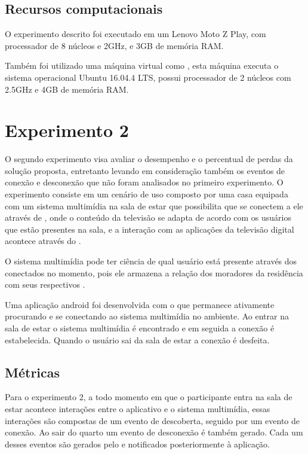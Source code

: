 \subsection{Recursos computacionais}

O experimento descrito foi executado em um \smartphone Lenovo Moto Z Play, com processador de 8 núcleos e 2GHz, e 3GB de memória RAM.

Também foi utilizado uma máquina virtual como \broker \mqtt, esta máquina executa o sistema operacional Ubuntu 16.04.4 LTS, possui processador de 2 núcleos com 2.5GHz e 4GB de memória RAM.

\section{Experimento 2}

O segundo experimento visa avaliar o desempenho e o percentual de perdas da solução proposta, entretanto levando em consideração também os eventos de conexão e desconexão que não foram analisados no primeiro experimento. O experimento consiste em um cenário de uso composto por uma casa equipada com um sistema multimídia na sala de estar que possibilita que \smartphones se conectem a ele através de \bluetooth, onde o conteúdo da televisão se adapta de acordo com os usuários que estão presentes na sala, e a interação com as aplicações da televisão digital acontece através do \smartphone.

O sistema multimídia pode ter ciência de qual usuário está presente através dos \smartphones conectados no momento, pois ele armazena a relação dos moradores da residência com seus respectivos \smartphones.

Uma aplicação android foi desenvolvida com o \middleware \mhubcddl que permanece ativamente procurando e se conectando ao sistema multimídia no ambiente. Ao entrar na sala de estar o sistema multimídia é encontrado e em seguida a conexão é estabelecida. Quando o usuário sai da sala de estar a conexão é desfeita. 

\subsection{Métricas}

Para o experimento 2, a todo momento em que o participante entra na sala de estar acontece interações entre o aplicativo e o sistema multimídia, essas interações são compostas de um evento de descoberta, seguido por um evento de conexão. Ao sair do quarto um evento de desconexão é também gerado. Cada um desses eventos são gerados pelo \stwopa e notificados posteriormente à aplicação.

